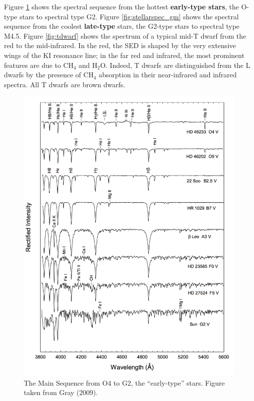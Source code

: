 \documentclass[a4paper,10pt]{article}
\begin{document}
{\noindent}Figure \ref{fig:stellarspec_og} shows the spectral sequence from the hottest \textbf{early-type stars}, the O-type stars to spectral type G2. Figure \ref{fig:stellarspec_gm} shows the spectral sequence from the coolest \textbf{late-type} stars, the G2-type stars to spectral type M4.5. Figure \ref{fig:tdwarf} shows the spectrum of a typical mid-T dwarf from the red to the mid-infrared. In the red, the SED is shaped by the very extensive wings of the KI resonance line; in the far red and infrared, the most prominent features are due to CH$_4$ and H$_2$O. Indeed, T dwarfs are distinguished from the L dwarfs by the presence of CH$_4$ absorption in their near-infrared and infrared spectra. All T dwarfs are brown dwarfs.

\begin{figure}[h]
    \centering
    \includegraphics[width=14cm]{figures/StellarSpectra_OG.png}
    \caption{\footnotesize{The Main Sequence from O4 to G2, the ``early-type'' stars. Figure taken from Gray (2009).}}
    \label{fig:stellarspec_og}
\end{figure}
\end{document}
